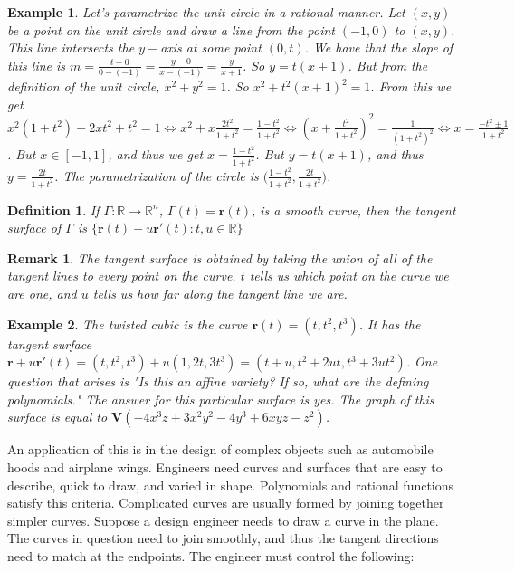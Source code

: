 \documentclass{article}
\theoremstyle{mystyle}
\newtheorem{definition}{Definition}[section]
\newtheorem{example}{Example}[section]
\newtheorem{remark}{Remark}[section]
\begin{document}
\begin{example}
Let's parametrize the unit circle in a rational manner. Let $(x,y)$ be a point on the unit circle and draw a line from the point $(-1,0)$ to $(x,y)$. This line intersects the $y-$axis at some point $(0,t)$. We have that the slope of this line is $m = \frac{t-0}{0-(-1)} = \frac{y-0}{x-(-1)} = \frac{y}{x+1}$. So $y = t(x+1)$. But from the definition of the unit circle, $x^2+y^2=1$. So $x^2+t^2(x+1)^2 = 1$. From this we get $x^2(1+t^2)+2xt^2 + t^2 = 1 \Leftrightarrow x^2+x\frac{2t^2}{1+t^2} = \frac{1-t^2}{1+t^2} \Leftrightarrow (x+ \frac{t^2}{1+t^2})^2 = \frac{1 }{(1+t^2)^2}\Leftrightarrow x = \frac{-t^2 \pm 1}{1+t^2}$. But $x\in [-1,1]$, and thus we get $x = \frac{1-t^2}{1+t^2}$. But $y = t(x+1)$, and thus $y = \frac{2t}{1+t^2}$. The parametrization of the circle is $\big(\frac{1-t^2}{1+t^2},\frac{2t}{1+t^2}\big)$.
\end{example}
\begin{definition}
If $\Gamma:\mathbb{R}\rightarrow \mathbb{R}^n$, $\Gamma(t) = \mathbf{r}(t)$, is a smooth curve, then the tangent surface of $\Gamma$ is $\{\mathbf{r}(t)+u\mathbf{r}'(t):t,u\in \mathbb{R}\}$
\end{definition}
\begin{remark}
The tangent surface is obtained by taking the union of all of the tangent lines to every point on the curve. $t$ tells us which point on the curve we are one, and $u$ tells us how far along the tangent line we are.
\end{remark}
\begin{example}
The twisted cubic is the curve $\mathbf{r}(t) = (t,t^2,t^3)$. It has the tangent surface $\mathbf{r}+u\mathbf{r}'(t)=(t,t^2,t^3)+u(1,2t,3t^3) = (t+u,t^2+2ut,t^3+3ut^2)$. One question that arises is "Is this an affine variety? If so, what are the defining polynomials." The answer for this particular surface is yes. The graph of this surface is equal to $\mathbf{V}(-4x^3z+3x^2y^2-4y^3+6xyz-z^2)$.
\end{example}
An application of this is in the design of complex objects such as automobile hoods and airplane wings. Engineers need curves and surfaces that are easy to describe, quick to draw, and varied in shape. Polynomials and rational functions satisfy this criteria. Complicated curves are usually formed by joining together simpler curves. Suppose a design engineer needs to draw a curve in the plane. The curves in question need to join smoothly, and thus the tangent directions need to match at the endpoints. The engineer must control the following:
\end{document}

